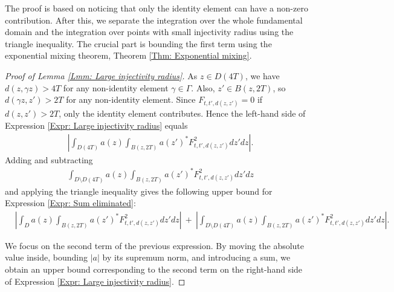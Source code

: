 \documentclass[11pt,twoside,reqno]{amsart} \usepackage{a4wide} \usepackage[T1]{fontenc} \usepackage[utf8]{inputenc} \usepackage{soul}  \usepackage{amsmath} \usepackage{amsfonts} \usepackage{amssymb} \usepackage{mathtools} \usepackage{amsthm} \usepackage{xcolor} \usepackage{graphicx} \usepackage{hyperref} \usepackage{standalone} \usepackage{esint} \usepackage{comment} \usepackage[left=2.3cm,top=3cm,right=2.3cm]{geometry} \usepackage{bm} \usepackage{svg} \usepackage{float} \numberwithin{equation}{section} \theoremstyle{plain} \newtheorem{thm}{Theorem}[section] \newtheorem{theorem}[thm]{Theorem} \newtheorem*{theorem*}{Theorem}\newtheorem{conj}[thm]{Conjecture} \newtheorem{lemma}[thm]{Lemma} \newtheorem{prop}[thm]{Proposition} \newtheorem{proposition}[thm]{Proposition} \newtheorem{cor}[thm]{Corollary} \newtheorem{question}[thm]{Question} \newtheorem{corollary}[thm]{Corollary} \newtheorem{assumption}[thm]{Assumption} \theoremstyle{definition} \newtheorem{defn}[thm]{Definition} \newtheorem{choice}[thm]{Choice} \newtheorem{definition}[thm]{Definition} \newtheorem{ex}[thm]{Example} \newtheorem{notation}[thm]{Notation} \newtheorem*{ack}{Acknowledgements} \theoremstyle{remark} \newtheorem{remark}[thm]{Remark} \newtheorem{bigremark}[thm]{Remark} \usepackage{xcolor} \newcommand{\red}[1]{ {\color{Red}#1} } \newcommand{\blue}[1]{ {\color{Blue}#1} } \author{Kai Hippi} \address{Aalto University, Espoo, Finland} \email{kai.hippi@aalto.fi}
\begin{document}
The proof is based on noticing that only the identity element can have a non-zero contribution. After this, we separate the integration over the whole fundamental domain and the integration over points with small injectivity radius using the triangle inequality. The crucial part is bounding the first term using the exponential mixing theorem, Theorem \ref{Thm: Exponential mixing}.

\begin{proof}[Proof of Lemma \ref{Lmm: Large injectivity radius}]
	As $ z \in D( 4T ) $, we have $ d( z, \gamma z ) > 4T $ for any non-identity element $ \gamma \in \Gamma $. Also, $ z' \in B( z, 2T ) $, so $ d( \gamma z, z' ) > 2T $ for any non-identity element. Since $ F_{t,t',d( z,z' )} = 0 $ if $ d( z,z' ) > 2T $, only the identity element contributes. Hence the left-hand side of Expression \eqref{Expr: Large injectivity radius} equals
	\begin{align}
		&
		\label{Expr: Sum eliminated}
		\left| \int_{D( 4T )} a( z ) \int_{ B( z, 2T ) } a( z' )^{*}   F_{t,t', d( z, z' )}^{2} dz' dz\right|.
	\end{align}
	Adding and subtracting
	\begin{align*}
		&
		\int_{D \setminus D( 4T )} a( z ) \int_{ B( z, 2T ) } a( z' )^{*}   F_{t,t', d( z, z' )}^{2} dz' dz
	\end{align*}
	and applying the triangle inequality gives the following upper bound for Expression \eqref{Expr: Sum eliminated}:
	\begin{align}
		&
		\left| \int_{D} a( z ) \int_{ B( z, 2T ) } a( z' )^{*}    F_{t,t', d( z, z' )}^{2} dz' dz\right| 
		\ + \
		\label{Expr: New large small InjRad split}
		\left| \int_{ D \setminus D( 4T )} a( z ) \int_{ B( z, 2T ) } a( z' )^{*}   F_{t,t', d( z,z' )}^{2} dz' dz\right|.
	\end{align}

	We focus on the second term of the previous expression. 
By moving the absolute value inside, bounding \( |a| \) by its supremum norm, and introducing a sum, we obtain an upper bound corresponding to the second term on the right-hand side of Expression \eqref{Expr: Large injectivity radius}. 


\end{proof}
\end{document}
